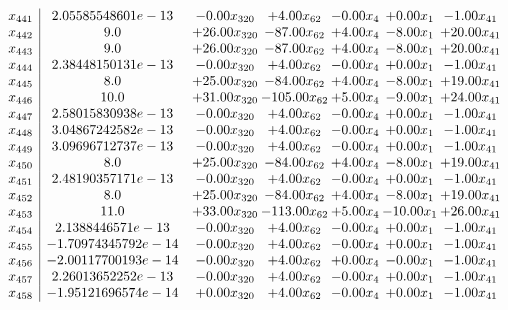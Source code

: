 \documentclass[8pt]{article}
\begin{document}
\[\begin{array}{c| c c@{\hskip 2pt} c@{\hskip 2pt} c@{\hskip 2pt} c@{\hskip 2pt} c@{\hskip 2pt} }
 x_{441}   &  2.05585548601e-13 & -0.00 x_{320} & +  4.00 x_{62} & -0.00 x_{4} & +  0.00 x_{1} & -1.00 x_{41}\\
 x_{442}   &  9.0 & + 26.00 x_{320} & -87.00 x_{62} & +  4.00 x_{4} & -8.00 x_{1} & + 20.00 x_{41}\\
 x_{443}   &  9.0 & + 26.00 x_{320} & -87.00 x_{62} & +  4.00 x_{4} & -8.00 x_{1} & + 20.00 x_{41}\\
 x_{444}   &  2.38448150131e-13 & -0.00 x_{320} & +  4.00 x_{62} & -0.00 x_{4} & +  0.00 x_{1} & -1.00 x_{41}\\
 x_{445}   &  8.0 & + 25.00 x_{320} & -84.00 x_{62} & +  4.00 x_{4} & -8.00 x_{1} & + 19.00 x_{41}\\
 x_{446}   &  10.0 & + 31.00 x_{320} & -105.00 x_{62} & +  5.00 x_{4} & -9.00 x_{1} & + 24.00 x_{41}\\
 x_{447}   &  2.58015830938e-13 & -0.00 x_{320} & +  4.00 x_{62} & -0.00 x_{4} & +  0.00 x_{1} & -1.00 x_{41}\\
 x_{448}   &  3.04867242582e-13 & -0.00 x_{320} & +  4.00 x_{62} & -0.00 x_{4} & +  0.00 x_{1} & -1.00 x_{41}\\
 x_{449}   &  3.09696712737e-13 & -0.00 x_{320} & +  4.00 x_{62} & -0.00 x_{4} & +  0.00 x_{1} & -1.00 x_{41}\\
 x_{450}   &  8.0 & + 25.00 x_{320} & -84.00 x_{62} & +  4.00 x_{4} & -8.00 x_{1} & + 19.00 x_{41}\\
 x_{451}   &  2.48190357171e-13 & -0.00 x_{320} & +  4.00 x_{62} & -0.00 x_{4} & +  0.00 x_{1} & -1.00 x_{41}\\
 x_{452}   &  8.0 & + 25.00 x_{320} & -84.00 x_{62} & +  4.00 x_{4} & -8.00 x_{1} & + 19.00 x_{41}\\
 x_{453}   &  11.0 & + 33.00 x_{320} & -113.00 x_{62} & +  5.00 x_{4} & -10.00 x_{1} & + 26.00 x_{41}\\
 x_{454}   &  2.1388446571e-13 & -0.00 x_{320} & +  4.00 x_{62} & -0.00 x_{4} & +  0.00 x_{1} & -1.00 x_{41}\\
 x_{455}   &  -1.70974345792e-14 & -0.00 x_{320} & +  4.00 x_{62} & -0.00 x_{4} & +  0.00 x_{1} & -1.00 x_{41}\\
 x_{456}   &  -2.00117700193e-14 & -0.00 x_{320} & +  4.00 x_{62} & +  0.00 x_{4} & -0.00 x_{1} & -1.00 x_{41}\\
 x_{457}   &  2.26013652252e-13 & -0.00 x_{320} & +  4.00 x_{62} & -0.00 x_{4} & +  0.00 x_{1} & -1.00 x_{41}\\
 x_{458}   &  -1.95121696574e-14 & +  0.00 x_{320} & +  4.00 x_{62} & -0.00 x_{4} & +  0.00 x_{1} & -1.00 x_{41}\\

\end{array}\]
\end{document}
